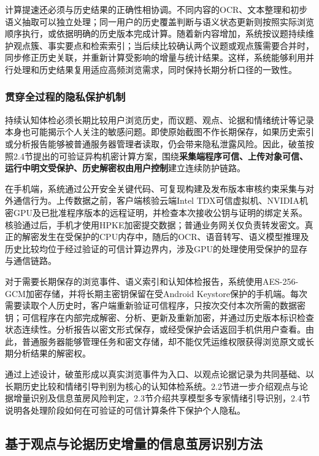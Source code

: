 计算提速还必须与历史结果的正确性相协调。不同内容的OCR、文本整理和初步语义抽取可以独立处理；同一用户的历史覆盖判断与语义状态更新则按照实际浏览顺序执行，或依据明确的历史版本完成计算。随着新内容增加，系统按议题持续维护观点簇、事实要点和检索索引；当后续比较确认两个议题或观点簇需要合并时，同步修正历史关联，并重新计算受影响的增量与统计结果。这样，系统能够利用并行处理和历史结果复用适应高频浏览需求，同时保持长期分析口径的一致性。

\subsubsection{贯穿全过程的隐私保护机制}\label{section:2.1.5}

持续认知体检必须长期比较用户浏览历史，而议题、观点、论据和情绪统计等记录本身也可能揭示个人关注的敏感问题。即使原始截图不作长期保存，如果历史索引或分析报告能够被普通服务器管理者读取，仍会带来隐私泄露风险。因此，破茧按照2.4节提出的可验证异构机密计算方案，围绕\textbf{采集端程序可信、上传对象可信、运行中明文受保护、历史解密权由用户控制}建立连续防护链路。

在手机端，系统通过公开安全关键代码、可复现构建及发布版本审核约束采集与对外通信行为。上传数据之前，客户端核验云端Intel TDX可信虚拟机、NVIDIA机密GPU及已批准程序版本的远程证明，并检查本次接收公钥与证明的绑定关系。核验通过后，手机才使用HPKE加密提交数据；普通业务网关仅负责转发密文。真正的解密发生在受保护的CPU内存中，随后的OCR、语音转写、语义模型推理及历史比较均位于经过验证的可信计算边界内，涉及GPU的处理使用受保护的显存与通信链路。

对于需要长期保存的浏览事件、语义索引和认知体检报告，系统使用AES-256-GCM加密存储，并将长期主密钥保留在受Android Keystore保护的手机端。每次需要读取个人历史时，客户端重新验证可信程序，只按次交付本次所需的数据密钥；可信程序在内部完成解密、分析、更新及重新加密，并通过历史版本标识检查状态连续性。分析报告以密文形式保存，或经受保护会话返回手机供用户查看。由此，普通服务器能够管理任务和密文存储，却不能仅凭运维权限获得浏览原文或长期分析结果的解密权。

通过上述设计，破茧形成以真实浏览事件为入口、以观点论据记录为共同基础、以长期历史比较和情绪引导判别为核心的认知体检系统。2.2节进一步介绍观点与论据增量识别及信息茧房风险判定，2.3节介绍共享模型多专家情绪引导识别，2.4节说明各处理阶段如何在可验证的可信计算条件下保护个人隐私。

\subsection{基于观点与论据历史增量的信息茧房识别方法}\label{section:2.2}

